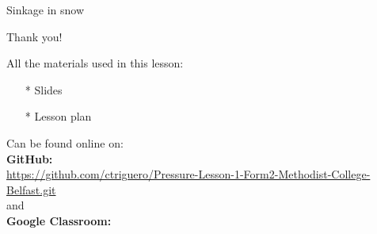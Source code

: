 \documentclass[usenames,dvipsnames]{beamer}
\begin{document}
\begin{frame}{\huge{Sinkage in snow}}
\begin{figure}
\end{figure}    

\end{frame}





\begin{frame}{\huge{Thank you!}}
    
    All the materials used in this lesson:
    \begin{itemize}
        \item[*] Slides
        \item[*] Lesson plan
    \end{itemize}
    Can be found online on:\\ %
    \textbf{GitHub:}\\
    \href{https://github.com/ctriguero/Pressure-Lesson-1-Form2-Methodist-College-Belfast.git}{https://github.com/ctriguero/Pressure-Lesson-1-Form2-Methodist-College-Belfast.git}\\
    and\\
    \textbf{Google Classroom:}\\
\end{frame}
\end{document}
